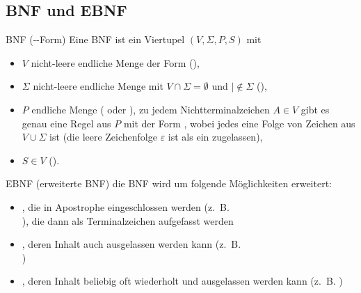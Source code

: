 \subsection{%
    BNF und EBNF%
}

\begin{Def}{BNF (--Form)}
    Eine BNF ist ein Viertupel $(V, \Sigma, P, S)$ mit
    \begin{itemize}
        \item $V$ nicht-leere endliche Menge der Form 
        (),
        
        \item $\Sigma$ nicht-leere endliche Menge mit
        $V \cap \Sigma = \emptyset$ und $| \notin \Sigma$
        (),
        
        \item $P$ endliche Menge ( oder
        ), zu jedem Nichtterminalzeichen $A \in V$ gibt
        es genau eine Regel aus $P$ mit der Form
        , wobei jedes  eine
        Folge von Zeichen aus $V \cup \Sigma$ ist
        (die leere Zeichenfolge $\varepsilon$ ist als ein 
        zugelassen),
        
        \item $S \in V$ ().
    \end{itemize}
\end{Def}

\begin{Def}{EBNF (erweiterte BNF)}
    die BNF wird um folgende Möglichkeiten erweitert:
    \begin{itemize}
        \item {}, die in Apostrophe
        eingeschlossen werden (z.~B. \\
        ), die dann als
        Terminalzeichen aufgefasst werden
        
        \item {}, deren Inhalt auch
        ausgelassen werden kann (z.~B. \\
        )
        
        \item {}, deren Inhalt
        beliebig oft wiederholt und ausgelassen werden kann (z.~B.
        )
    \end{itemize}    
\end{Def}

